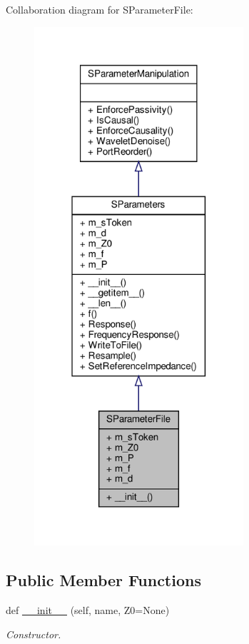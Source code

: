 Collaboration diagram for S\+Parameter\+File\+:
\nopagebreak
\begin{figure}[H]
\begin{center}
\leavevmode
\includegraphics[width=220pt]{classSignalIntegrity_1_1SParameters_1_1SParameterFile_1_1SParameterFile__coll__graph}
\end{center}
\end{figure}
\subsection*{Public Member Functions}
\begin{DoxyCompactItemize}
\item 
def \hyperlink{classSignalIntegrity_1_1SParameters_1_1SParameterFile_1_1SParameterFile_ac64ec849ddf7924828e6292d81a6c5d0}{\+\_\+\+\_\+init\+\_\+\+\_\+} (self, name, Z0=None)
\begin{DoxyCompactList}\small\item\em Constructor. \end{DoxyCompactList}\end{DoxyCompactItemize}


